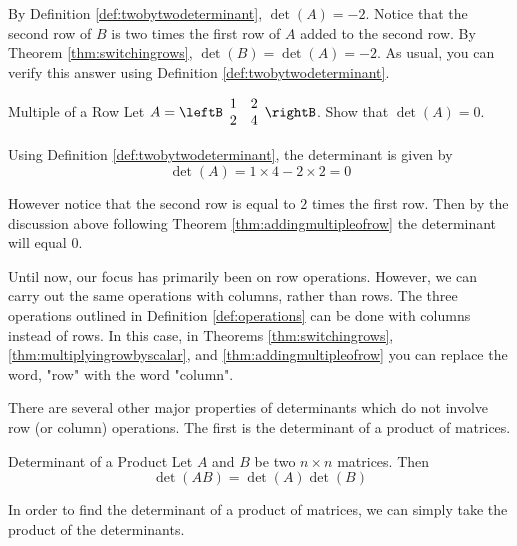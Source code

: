 \begin{solution}
By Definition \ref{def:twobytwodeterminant}, $\det \left(A\right) = -2$. 
Notice that the second row of $B$ is two times the first row of $A$ added
to the second row. 
By Theorem \ref{thm:switchingrows}, $\det \left( B\right) = \det \left( A \right)
=-2$.
As usual, you can verify this answer using Definition \ref{def:twobytwodeterminant}.
\end{solution}

\begin{example}{Multiple of a Row}\label{exa:multiplerows}
Let $A = \leftB \begin{array}{rr}
1 & 2 \\
2 & 4 
\end{array} \rightB$. Show that $\det \left( A \right) = 0$. 
\end{example}

\begin{solution}
Using Definition \ref{def:twobytwodeterminant}, the determinant is given by
\[
\det \left( A \right) = 1 \times 4 - 2 \times 2 = 0
\]

However notice that the second row is equal to $2$ times the first row. Then by the discussion above following Theorem \ref{thm:addingmultipleofrow} the determinant will equal $0$.
\end{solution}

Until now, our focus has primarily been on row operations. However, we can carry out the 
same operations with columns, rather than rows. The three operations outlined in
Definition \ref{def:operations} can be done with columns instead of rows. 
In this case, in Theorems \ref{thm:switchingrows}, \ref{thm:multiplyingrowbyscalar}, 
and \ref{thm:addingmultipleofrow} you can replace
the word, "row" with the word "column".

There are several other major properties of determinants which do not involve
row (or column) operations. The first is the determinant of a product of matrices. 

\begin{theorem}{Determinant of a Product}\label{thm:determinantofproduct}
Let $A$ and $B$ be two $n\times n$ matrices. Then 
\begin{equation*}
\det \left( AB\right) =\det \left( A\right) \det \left( B\right)
\end{equation*}
\end{theorem}

In order to find the determinant of a product of matrices, we can simply take the product of the determinants. 

